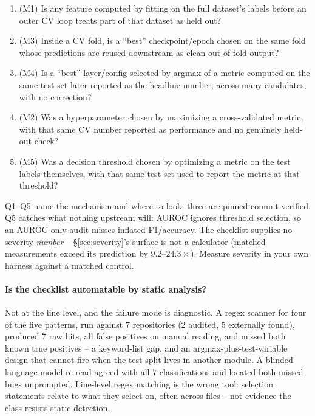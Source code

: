 \documentclass{article}
\begin{document}
\begin{enumerate}
\itemsep0pt
\item (M1) Is any feature computed by fitting on the full dataset's labels
   before an outer CV loop treats part of that dataset as held out?
\item (M3) Inside a CV fold, is a ``best'' checkpoint/epoch chosen on the same
   fold whose predictions are reused downstream as clean out-of-fold output?
\item (M4) Is a ``best'' layer/config selected by argmax of a metric computed
   on the same test set later reported as the headline number, across many
   candidates, with no correction?
\item (M2) Was a hyperparameter chosen by maximizing a cross-validated metric,
   with that same CV number reported as performance and no genuinely held-out
   check?
\item (M5) Was a decision threshold chosen by optimizing a metric on the test
   labels themselves, with that same test set used to report the metric at
   that threshold?
\end{enumerate}

Q1--Q5 name the mechanism and where to look; three are pinned-commit-verified.
Q5 catches what nothing upstream will: AUROC ignores threshold selection, so an
AUROC-only audit misses inflated F1/accuracy. The checklist supplies no
severity \emph{number} -- \S\ref{sec:severity}'s surface is not a calculator
(matched measurements exceed its prediction by $9.2$--$24.3\times$). Measure
severity in your own harness against a matched control.

\paragraph{Is the checklist automatable by static analysis?} Not at the line
level, and the failure mode is diagnostic. A regex scanner for four of the five
patterns, run against 7 repositories (2 audited, 5 externally found), produced
7 raw hits, all false positives on manual reading, and missed both known true
positives -- a keyword-list gap, and an argmax-plus-test-variable design that
cannot fire when the test split lives in another module. A blinded
language-model re-read agreed with all 7 classifications and located both
missed bugs unprompted. Line-level regex matching is the wrong tool: selection
statements relate to what they select on, often across files -- not evidence
the class resists static detection.
\end{document}
